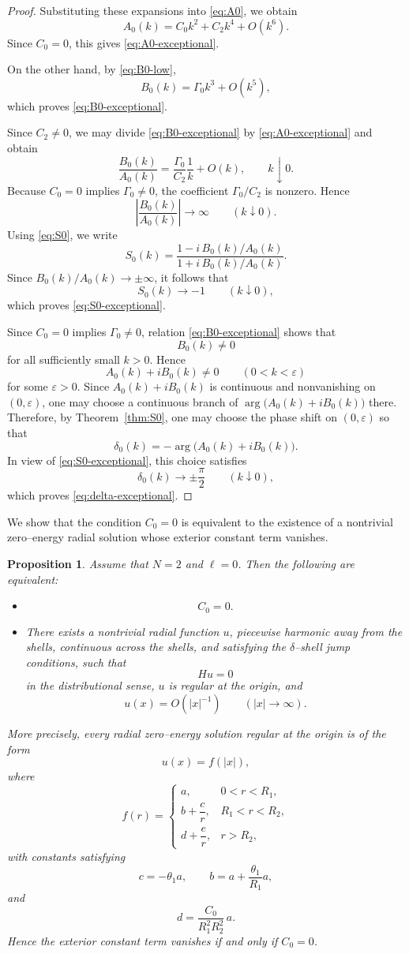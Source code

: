 \documentclass[a4paper,11pt]{article}
\numberwithin{equation}{section}
\newtheorem{prop}[thm]{Proposition}
\theoremstyle{definition}
\theoremstyle{remark}
\begin{document}
\begin{proof}
Substituting these expansions into \eqref{eq:A0}, we obtain
\[
A_0(k)=C_0k^2+C_2k^4+O(k^6).
\]
Since $C_0=0$, this gives \eqref{eq:A0-exceptional}.

On the other hand, by \eqref{eq:B0-low},
\[
B_0(k)=\Gamma_0k^3+O(k^5),
\]
which proves \eqref{eq:B0-exceptional}.

Since $C_2\neq0$, we may divide \eqref{eq:B0-exceptional} by
\eqref{eq:A0-exceptional} and obtain
\[
\frac{B_0(k)}{A_0(k)}
=
\frac{\Gamma_0}{C_2}\frac{1}{k}+O(k),
\qquad k\downarrow0.
\]
Because $C_0=0$ implies $\Gamma_0\neq0$, the coefficient $\Gamma_0/C_2$ is
nonzero. Hence
\[
\left|\frac{B_0(k)}{A_0(k)}\right|\to\infty
\qquad (k\downarrow0).
\]
Using \eqref{eq:S0}, we write
\[
S_0(k)
=
\frac{1-i\,B_0(k)/A_0(k)}{1+i\,B_0(k)/A_0(k)}.
\]
Since $B_0(k)/A_0(k)\to\pm\infty$, it follows that
\[
S_0(k)\to -1
\qquad (k\downarrow0),
\]
which proves \eqref{eq:S0-exceptional}.

Since $C_0=0$ implies $\Gamma_0\neq0$, relation \eqref{eq:B0-exceptional}
shows that
\[
B_0(k)\neq0
\]
for all sufficiently small $k>0$. Hence
\[
A_0(k)+iB_0(k)\neq0
\qquad (0<k<\varepsilon)
\]
for some $\varepsilon>0$. Since $A_0(k)+iB_0(k)$ is continuous and
nonvanishing on $(0,\varepsilon)$, one may choose a continuous branch of
$\arg\bigl(A_0(k)+iB_0(k)\bigr)$ there. Therefore, by
Theorem~\ref{thm:S0}, one may choose the phase shift on $(0,\varepsilon)$ so
that
\[
\delta_0(k)=-\arg\bigl(A_0(k)+iB_0(k)\bigr).
\]
In view of \eqref{eq:S0-exceptional}, this choice satisfies
\[
\delta_0(k)\to \pm\frac{\pi}{2}
\qquad (k\downarrow0),
\]
which proves \eqref{eq:delta-exceptional}.
\end{proof}
We show that the condition $C_0=0$ is equivalent to the existence of a
nontrivial zero--energy radial solution whose exterior constant term
vanishes.

\begin{prop}
\label{prop:C0-zero-energy}
Assume that $N=2$ and $\ell=0$. Then the following are equivalent:

\begin{itemize}
\item[(i)]
\[
C_0=0.
\]

\item[(ii)]
There exists a nontrivial radial function $u$, piecewise harmonic away from
the shells, continuous across the shells, and satisfying the $\delta$--shell
jump conditions, such that
\[
Hu=0
\]
in the distributional sense, $u$ is regular at the origin, and
\[
u(x)=O(|x|^{-1})
\qquad (|x|\to\infty).
\]
\end{itemize}

More precisely, every radial zero--energy solution regular at the origin is of
the form
\[
u(x)=f(|x|),
\]
where
\[
f(r)=
\begin{cases}
a, & 0<r<R_1,\\[2mm]
b+\dfrac{c}{r}, & R_1<r<R_2,\\[3mm]
d+\dfrac{e}{r}, & r>R_2,
\end{cases}
\]
with constants satisfying
\[
c=-\theta_1 a,
\qquad
b=a+\frac{\theta_1}{R_1}a,
\]
and
\[
d=\frac{C_0}{R_1^2R_2^2}\,a.
\]
Hence the exterior constant term vanishes if and only if $C_0=0$.
\end{prop}
\end{document}
